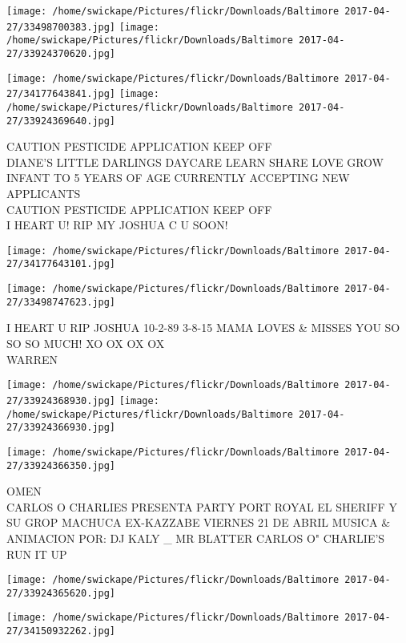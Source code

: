\documentclass[10pt,letterpaper]{article}
\begin{document}
\texttt{[image: /home/swickape/Pictures/flickr/Downloads/Baltimore 2017-04-27/33498700383.jpg]}
\texttt{[image: /home/swickape/Pictures/flickr/Downloads/Baltimore 2017-04-27/33924370620.jpg]}

\texttt{[image: /home/swickape/Pictures/flickr/Downloads/Baltimore 2017-04-27/34177643841.jpg]}
\texttt{[image: /home/swickape/Pictures/flickr/Downloads/Baltimore 2017-04-27/33924369640.jpg]}

CAUTION PESTICIDE APPLICATION KEEP OFF\\
DIANE'S LITTLE DARLINGS DAYCARE LEARN SHARE LOVE GROW INFANT TO 5 YEARS OF AGE CURRENTLY ACCEPTING NEW APPLICANTS\\
CAUTION PESTICIDE APPLICATION KEEP OFF\\
I HEART U!  RIP MY JOSHUA C U SOON!\\
\pagebreak

\texttt{[image: /home/swickape/Pictures/flickr/Downloads/Baltimore 2017-04-27/34177643101.jpg]}

\vspace{0.25in}
\texttt{[image: /home/swickape/Pictures/flickr/Downloads/Baltimore 2017-04-27/33498747623.jpg]}

I HEART U RIP JOSHUA 10{-}2{-}89 3{-}8{-}15 MAMA LOVES \& MISSES YOU SO SO SO MUCH! XO OX OX OX\\
WARREN\\
\pagebreak

\texttt{[image: /home/swickape/Pictures/flickr/Downloads/Baltimore 2017-04-27/33924368930.jpg]}
\texttt{[image: /home/swickape/Pictures/flickr/Downloads/Baltimore 2017-04-27/33924366930.jpg]}

\texttt{[image: /home/swickape/Pictures/flickr/Downloads/Baltimore 2017-04-27/33924366350.jpg]}

OMEN\\
CARLOS O CHARLIES PRESENTA PARTY PORT ROYAL EL SHERIFF Y SU GROP MACHUCA EX{-}KAZZABE VIERNES 21 DE ABRIL MUSICA \& ANIMACION POR: DJ KALY \_ MR BLATTER CARLOS O" CHARLIE'S\\
RUN IT UP\\
\pagebreak

\texttt{[image: /home/swickape/Pictures/flickr/Downloads/Baltimore 2017-04-27/33924365620.jpg]}

\vspace{0.25in}
\texttt{[image: /home/swickape/Pictures/flickr/Downloads/Baltimore 2017-04-27/34150932262.jpg]}
\end{document}
